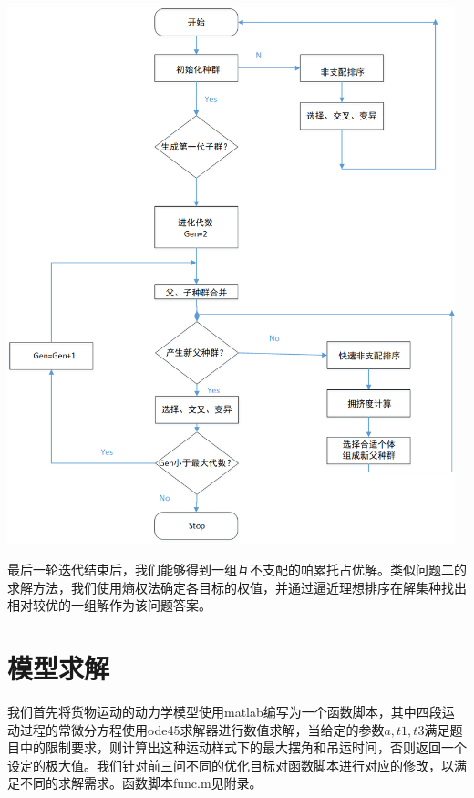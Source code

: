 \documentclass[withoutpreface,bwprint]{cumcmthesis} %
\begin{document}
\centerline{\includegraphics[width=13cm]{p2demo.png}}

最后一轮迭代结束后，我们能够得到一组互不支配的帕累托占优解。类似问题二的求解方法，我们使用熵权法确定各目标的权值，并通过逼近理想排序在解集种找出相对较优的一组解作为该问题答案。

\section{模型求解}
我们首先将货物运动的动力学模型使用matlab编写为一个函数脚本，其中四段运动过程的常微分方程使用ode45求解器进行数值求解，当给定的参数$a,t1,t3$满足题目中的限制要求，则计算出这种运动样式下的最大摆角和吊运时间，否则返回一个设定的极大值。我们针对前三问不同的优化目标对函数脚本进行对应的修改，以满足不同的求解需求。函数脚本func.m见附录。
\end{document}
